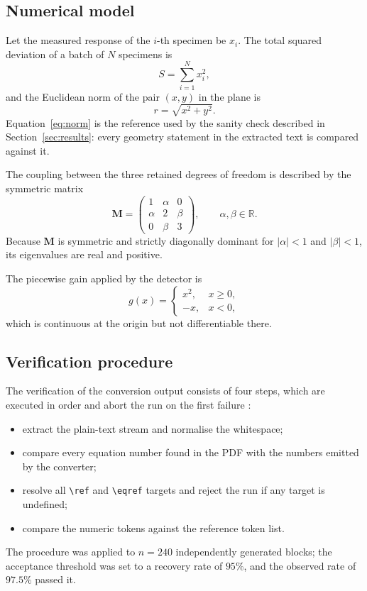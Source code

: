 \documentclass[10pt,twocolumn,a4paper]{article}
\begin{document}
\subsection{Numerical model}

Let the measured response of the $i$-th specimen be $x_i$. The total squared
deviation of a batch of $N$ specimens is
\begin{equation}
\label{eq:sum}
S = \sum_{i=1}^{N} x_i^{2} ,
\end{equation}
and the Euclidean norm of the pair $(x, y)$ in the plane is
\begin{equation}
\label{eq:norm}
r = \sqrt{x^{2} + y^{2}} .
\end{equation}
Equation~\eqref{eq:norm} is the reference used by the sanity check described
in Section~\ref{sec:results}: every geometry statement in the extracted text
is compared against it.

The coupling between the three retained degrees of freedom is described by
the symmetric matrix
\begin{equation}
\label{eq:matrix}
\mathbf{M} =
\begin{pmatrix}
1      & \alpha & 0 \\
\alpha & 2      & \beta \\
0      & \beta  & 3
\end{pmatrix},
\qquad \alpha, \beta \in \mathbb{R} .
\end{equation}
Because $\mathbf{M}$ is symmetric and strictly diagonally dominant for
$|\alpha| < 1$ and $|\beta| < 1$, its eigenvalues are real and positive.

The piecewise gain applied by the detector is
\begin{equation}
\label{eq:cases}
g(x) =
\begin{cases}
x^{2}, & x \ge 0 ,\\[2pt]
-x,    & x < 0 ,
\end{cases}
\end{equation}
which is continuous at the origin but not differentiable there.

\subsection{Verification procedure}

The verification of the conversion output consists of four steps, which are
executed in order and abort the run on the first failure \cite{ref4}:
\begin{itemize}
  \item extract the plain-text stream and normalise the whitespace;
  \item compare every equation number found in the PDF with the numbers
        emitted by the converter;
  \item resolve all \verb|\ref| and \verb|\eqref| targets and reject the run
        if any target is undefined;
  \item compare the numeric tokens against the reference token list.
\end{itemize}
The procedure was applied to $n = 240$ independently generated blocks; the
acceptance threshold was set to a recovery rate of $95\%$, and the observed
rate of $97.5\%$ passed it.
\end{document}
